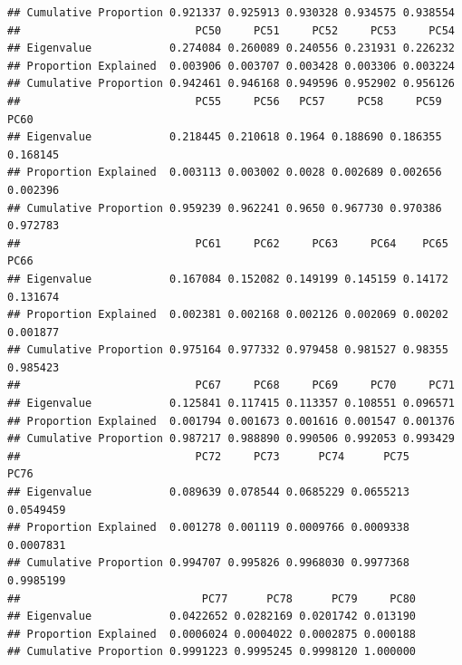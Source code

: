 \documentclass[]{article}
\newenvironment{Shaded}{\begin{snugshade}}{\end{snugshade}}
\newcommand{\KeywordTok}[1]{\textcolor[rgb]{0.13,0.29,0.53}{\textbf{#1}}}
\newcommand{\NormalTok}[1]{#1}
\newcommand{\OperatorTok}[1]{\textcolor[rgb]{0.81,0.36,0.00}{\textbf{#1}}}
\begin{document}
\begin{verbatim}
## Cumulative Proportion 0.921337 0.925913 0.930328 0.934575 0.938554
##                           PC50     PC51     PC52     PC53     PC54
## Eigenvalue            0.274084 0.260089 0.240556 0.231931 0.226232
## Proportion Explained  0.003906 0.003707 0.003428 0.003306 0.003224
## Cumulative Proportion 0.942461 0.946168 0.949596 0.952902 0.956126
##                           PC55     PC56   PC57     PC58     PC59     PC60
## Eigenvalue            0.218445 0.210618 0.1964 0.188690 0.186355 0.168145
## Proportion Explained  0.003113 0.003002 0.0028 0.002689 0.002656 0.002396
## Cumulative Proportion 0.959239 0.962241 0.9650 0.967730 0.970386 0.972783
##                           PC61     PC62     PC63     PC64    PC65     PC66
## Eigenvalue            0.167084 0.152082 0.149199 0.145159 0.14172 0.131674
## Proportion Explained  0.002381 0.002168 0.002126 0.002069 0.00202 0.001877
## Cumulative Proportion 0.975164 0.977332 0.979458 0.981527 0.98355 0.985423
##                           PC67     PC68     PC69     PC70     PC71
## Eigenvalue            0.125841 0.117415 0.113357 0.108551 0.096571
## Proportion Explained  0.001794 0.001673 0.001616 0.001547 0.001376
## Cumulative Proportion 0.987217 0.988890 0.990506 0.992053 0.993429
##                           PC72     PC73      PC74      PC75      PC76
## Eigenvalue            0.089639 0.078544 0.0685229 0.0655213 0.0549459
## Proportion Explained  0.001278 0.001119 0.0009766 0.0009338 0.0007831
## Cumulative Proportion 0.994707 0.995826 0.9968030 0.9977368 0.9985199
##                            PC77      PC78      PC79     PC80
## Eigenvalue            0.0422652 0.0282169 0.0201742 0.013190
## Proportion Explained  0.0006024 0.0004022 0.0002875 0.000188
## Cumulative Proportion 0.9991223 0.9995245 0.9998120 1.000000
\end{verbatim}

\begin{Shaded}
\end{Shaded}
\end{document}
